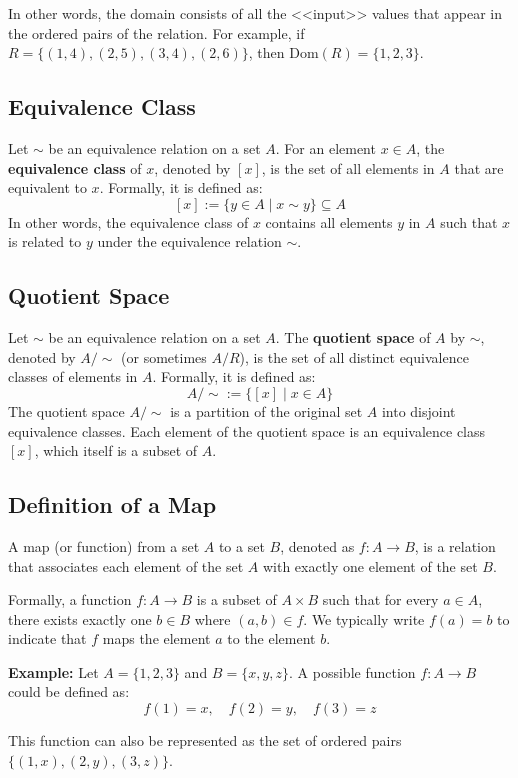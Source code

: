In other words, the domain consists of all the <<input>> values that appear in the ordered pairs of the relation. For example, if $R = \{(1,4), (2,5), (3,4), (2,6)\}$, then $\text{Dom}(R) = \{1, 2, 3\}$.

\subsection{Equivalence Class}
\label{subsection:equivalence_class}
Let $\sim$ be an equivalence relation on a set $A$. For an element $x \in A$, the \textbf{equivalence class} of $x$, denoted by $[x]$, is the set of all elements in $A$ that are equivalent to $x$. Formally, it is defined as:
\[[x] := \{y \in A \mid x \sim y\} \subseteq A\]
In other words, the equivalence class of $x$ contains all elements $y$ in $A$ such that $x$ is related to $y$ under the equivalence relation $\sim$.

\subsection{Quotient Space}
\label{subsection:quotient_space}
Let $\sim$ be an equivalence relation on a set $A$. The \textbf{quotient space} of $A$ by $\sim$, denoted by $A/\sim$ (or sometimes $A/R$), is the set of all distinct equivalence classes of elements in $A$. Formally, it is defined as:
\[A/\sim := \{[x] \mid x \in A\}\]
The quotient space $A/\sim$ is a partition of the original set $A$ into disjoint equivalence classes. Each element of the quotient space is an equivalence class $[x]$, which itself is a subset of $A$.

\subsection{Definition of a Map}
A map (or function) from a set $A$ to a set $B$, denoted as $f: A \rightarrow B$, is a relation that associates each element of the set $A$ with exactly one element of the set $B$.

Formally, a function $f: A \rightarrow B$ is a subset of $A \times B$ such that for every $a \in A$, there exists exactly one $b \in B$ where $(a,b) \in f$. We typically write $f(a) = b$ to indicate that $f$ maps the element $a$ to the element $b$.

\textbf{Example:} Let $A = \{1, 2, 3\}$ and $B = \{x, y, z\}$. A possible function $f: A \rightarrow B$ could be defined as:
\[
	f(1) = x, \quad f(2) = y, \quad f(3) = z
\]

This function can also be represented as the set of ordered pairs $\{(1,x), (2,y), (3,z)\}$.

